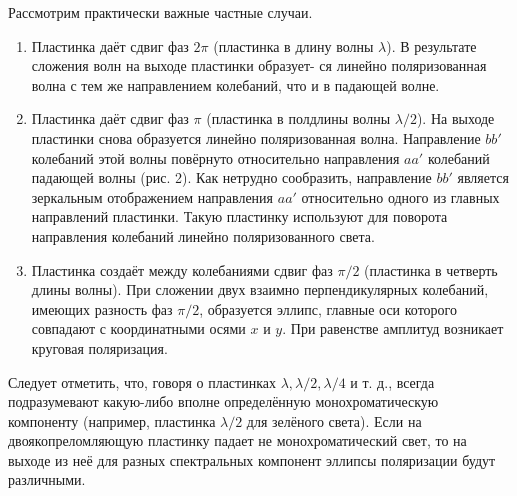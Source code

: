Рассмотрим практически важные частные случаи.
\begin{enumerate}
 		
  \item Пластинка даёт сдвиг фаз $ 2\pi $ (пластинка в длину волны $ \lambda $). В результате сложения волн на выходе пластинки образует-
ся линейно поляризованная волна с тем же направлением колебаний, что и в падающей волне.

 \item Пластинка даёт сдвиг фаз $ \pi $ (пластинка в полдлины волны $ \lambda / 2 $). На выходе пластинки снова образуется линейно поляризованная волна. Направление $ bb' $ колебаний этой волны повёрнуто относительно направления $ aa' $ колебаний падающей волны (рис. 2). Как нетрудно сообразить, направление $ bb' $ является зеркальным отображением направления $ aa' $ относительно одного из главных направлений пластинки. Такую пластинку используют для поворота направления колебаний линейно поляризованного света.
 
 \item Пластинка создаёт между колебаниями сдвиг фаз $ \pi/2 $ (пластинка
в четверть длины волны). При сложении двух взаимно перпендикулярных колебаний, имеющих разность фаз $ \pi/2 $, образуется эллипс, главные оси которого совпадают с координатными осями $ x $ и $ y $. При равенстве амплитуд возникает круговая поляризация.
  
\end{enumerate}

Следует отметить, что, говоря о пластинках $ \lambda , \lambda/2, \lambda/4  $ и т. д., всегда подразумевают какую-либо вполне определённую монохроматическую
компоненту (например, пластинка $ \lambda/2 $ для зелёного света). Если на двоякопреломляющую пластинку падает не монохроматический свет, то на
выходе из неё для разных спектральных компонент эллипсы поляризации будут различными.
